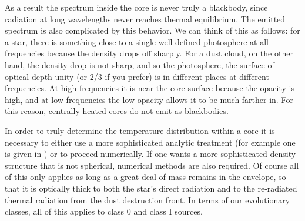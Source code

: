 As a result the spectrum inside the core is never truly a blackbody, since radiation at long wavelengths never reaches thermal equilibrium. The emitted spectrum is also complicated by this behavior. We can think of this as follows: for a star, there is something close to a single well-defined photosphere at all frequencies because the density drops off sharply. For a dust cloud, on the other hand, the density drop is not sharp, and so the photosphere, the surface of optical depth unity (or 2/3 if you prefer) is in different places at different frequencies. At high frequencies it is near the core surface because the opacity is high, and at low frequencies the low opacity allows it to be much farther in. For this reason, centrally-heated cores do not emit as blackbodies.

In order to truly determine the temperature distribution within a core it is necessary to either use a more sophisticated analytic treatment (for example one is given in \citealt{chakrabarti05a}) or to proceed numerically. If one wants a more sophisticated density structure that is not spherical, numerical methods are also required. Of course all of this only applies as long as a great deal of mass remains in the envelope, so that it is optically thick to both the star's direct radiation and to the re-radiated thermal radiation from the dust destruction front. In terms of our evolutionary classes, all of this applies to class 0 and class I sources.
